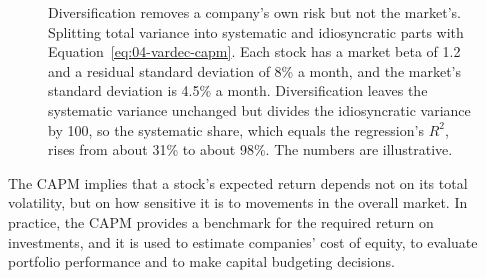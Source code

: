 \begin{figure}[!htbp]
  \centering
  \caption{Diversification removes a company's own risk but not the market's. Splitting total variance into systematic and idiosyncratic parts with Equation~\eqref{eq:04-vardec-capm}. Each stock has a market beta of 1.2 and a residual standard deviation of 8\% a month, and the market's standard deviation is 4.5\% a month. Diversification leaves the systematic variance unchanged but divides the idiosyncratic variance by 100, so the systematic share, which equals the regression's $R^2$, rises from about 31\% to about 98\%. The numbers are illustrative.}
  \label{fig:04-vardec}
\end{figure}

The CAPM implies that a stock's expected return depends not on its total volatility, but on how sensitive it is to movements in the overall market. In practice, the CAPM provides a benchmark for the required return on investments, and it is used to estimate companies' cost of equity, to evaluate portfolio performance and to make capital budgeting decisions.

